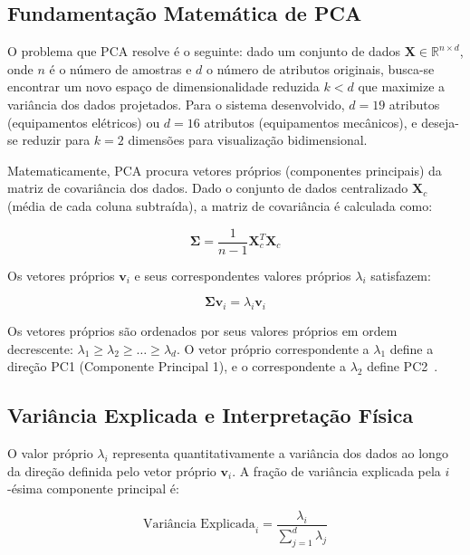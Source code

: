 \subsection{Fundamentação Matemática de PCA}

O problema que PCA resolve é o seguinte: dado um conjunto de dados $\mathbf{X} \in \mathbb{R}^{n \times d}$, onde $n$ é o número de amostras e $d$ o número de atributos originais, busca-se encontrar um novo espaço de dimensionalidade reduzida $k < d$ que maximize a variância dos dados projetados. Para o sistema desenvolvido, $d = 19$ atributos (equipamentos elétricos) ou $d = 16$ atributos (equipamentos mecânicos), e deseja-se reduzir para $k = 2$ dimensões para visualização bidimensional.

Matematicamente, PCA procura vetores próprios (componentes principais) da matriz de covariância dos dados. Dado o conjunto de dados centralizado $\mathbf{X}_c$ (média de cada coluna subtraída), a matriz de covariância é calculada como:

\begin{equation}
    \mathbf{\Sigma} = \frac{1}{n-1} \mathbf{X}_c^T \mathbf{X}_c
    \label{eq:covariance_matrix}
\end{equation}

Os vetores próprios $\mathbf{v}_i$ e seus correspondentes valores próprios $\lambda_i$ satisfazem:

\begin{equation}
    \mathbf{\Sigma} \mathbf{v}_i = \lambda_i \mathbf{v}_i
    \label{eq:eigenvalue_problem}
\end{equation}

Os vetores próprios são ordenados por seus valores próprios em ordem decrescente: $\lambda_1 \geq \lambda_2 \geq \ldots \geq \lambda_d$. O vetor próprio correspondente a $\lambda_1$ define a direção PC1 (Componente Principal 1), e o correspondente a $\lambda_2$ define PC2~\cite{jolliffe2002principal}.

\subsection{Variância Explicada e Interpretação Física}

O valor próprio $\lambda_i$ representa quantitativamente a variância dos dados ao longo da direção definida pelo vetor próprio $\mathbf{v}_i$. A fração de variância explicada pela $i$-ésima componente principal é:

\begin{equation}
    \text{Variância Explicada}_i = \frac{\lambda_i}{\sum_{j=1}^{d} \lambda_j}
    \label{eq:variance_explained}
\end{equation}

